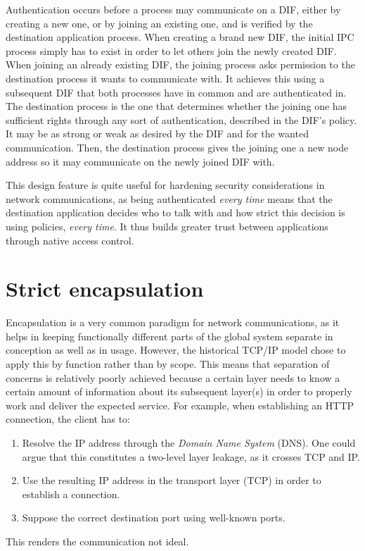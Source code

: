 \documentclass[a4paper]{proc}
\begin{document}
\par Authentication occurs before a process may communicate on a DIF, either by
creating a new one, or by joining an existing one, and is verified by the
destination application process. When creating a brand new DIF, the initial IPC
process simply has to exist in order to let others join the newly created DIF.
When joining an already existing DIF, the joining process asks permission to the
destination process it wants to communicate with. It achieves this using a
subsequent DIF that both processes have in common and are authenticated in.
The destination process is the one that determines whether the joining one has
sufficient rights through any sort of authentication, described in the DIF's
policy. It may be as strong or weak as desired by the DIF and for the wanted
communication. Then, the destination process gives the joining one a new
node address so it may communicate on the newly joined DIF with.

\par This design feature is quite useful for hardening security considerations
in network communications, as being authenticated \textit{every time} means that
the destination application decides who to talk with and how strict this
decision is using policies, \textit{every time}. It thus builds greater trust
between applications through native access control.

\section{Strict encapsulation}

\par Encapsulation is a very common paradigm for network communications, as it
helps in keeping functionally different parts of the global system separate in
conception as well as in usage. However, the historical TCP/IP model chose to
apply this by function rather than by scope. This means that separation of
concerns is relatively poorly achieved because a certain layer needs to know a
certain amount of information about its subsequent layer(s) in order to properly
work and deliver the expected service. For example, when establishing an HTTP
connection, the client has to:
\begin{enumerate}
    \item Resolve the IP address through the \textit{Domain Name System} (DNS).
        One could argue that this constitutes a two-level layer leakage, as it
        crosses TCP and IP.
    \item Use the resulting IP address in the transport layer (TCP) in order to
        establish a connection.
    \item Suppose the correct destination port using well-known ports.
\end{enumerate}
This renders the communication not ideal.
\end{document}
